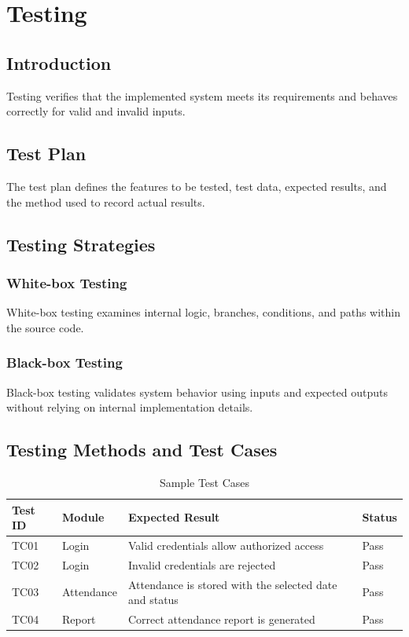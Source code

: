 \documentclass[12pt,a4paper]{report}
\begin{document}
\chapter{Testing}

\section{Introduction}
Testing verifies that the implemented system meets its requirements and behaves correctly for valid and invalid inputs.

\section{Test Plan}
The test plan defines the features to be tested, test data, expected results, and the method used to record actual results.

\section{Testing Strategies}
\subsection{White-box Testing}
White-box testing examines internal logic, branches, conditions, and paths within the source code.

\subsection{Black-box Testing}
Black-box testing validates system behavior using inputs and expected outputs without relying on internal implementation details.

\section{Testing Methods and Test Cases}
\begin{table}[htbp]
\centering
\renewcommand{\arraystretch}{1.25}
\begin{tabular}{>{\raggedright\arraybackslash}p{}
                >{\raggedright\arraybackslash}p{}
                >{\raggedright\arraybackslash}p{}
                >{\raggedright\arraybackslash}p{}}
\toprule
\textbf{Test ID} & \textbf{Module} & \textbf{Expected Result} & \textbf{Status}\\
\midrule
TC01 & Login & Valid credentials allow authorized access & Pass\\
TC02 & Login & Invalid credentials are rejected & Pass\\
TC03 & Attendance & Attendance is stored with the selected date and status & Pass\\
TC04 & Report & Correct attendance report is generated & Pass\\
\bottomrule
\end{tabular}
\caption{Sample Test Cases}
\end{table}
\end{document}
